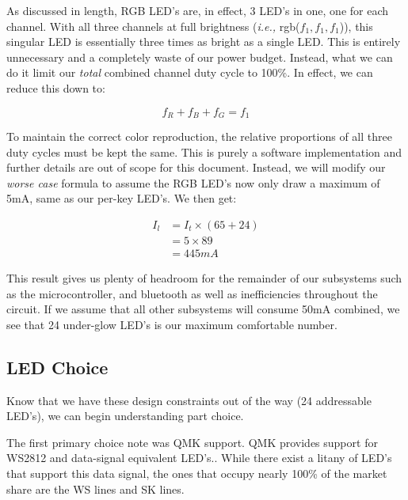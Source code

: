 \documentclass[11pt]{article}
\begin{document}
As discussed in length, RGB LED's are, in effect, 3 LED's in one, one for each channel. With all three channels at full brightness (\emph{i.e.,} rgb(\(f_{1},f_{1},f_{1}\))), this singular LED is essentially three times as bright as a single LED. This is entirely unnecessary and a completely waste of our power budget. Instead, what we can do it limit our \emph{total} combined channel duty cycle to 100\%.\footnotemark {} In effect, we can reduce this down to:

\begin{equation}
	f_R + f_B + f_G = f_1
\end{equation}

To maintain the correct color reproduction, the relative proportions of all three duty cycles must be kept the same. This is purely a software implementation and further details are out of scope for this document. Instead, we will modify our \emph{worse case} formula to assume the RGB LED's now only draw a maximum of 5mA, same as our per-key LED's. We then get:

\begin{equation}
\begin{aligned}
	I_l &= I_t \times (65 + 24) \\
	&= 5 \times 89 \\
	&= 445mA
\end{aligned}
\end{equation}

This result gives us plenty of headroom for the remainder of our subsystems such as the microcontroller, and bluetooth as well as inefficiencies throughout the circuit. If we assume that all other subsystems will consume 50mA combined, we see that 24 under-glow LED's is our maximum comfortable number. 

\subsection{LED Choice}

Know that we have these design constraints out of the way (24 addressable LED's), we can begin understanding part choice. 

The first primary choice note was QMK support. QMK provides support for WS2812 and data-signal equivalent LED's.\footnotemark {}. While there exist a litany of LED's that support this data signal, the ones that occupy nearly 100\% of the market share are the WS lines and SK lines. 
\end{document}
